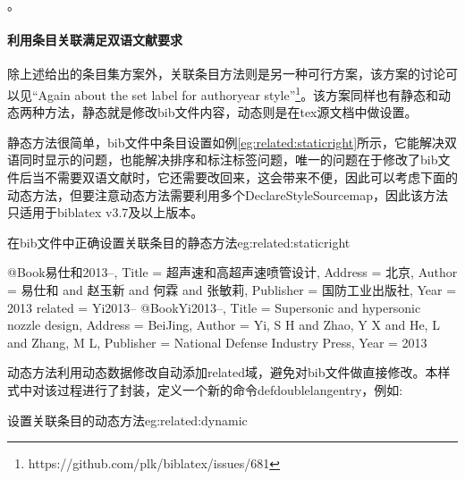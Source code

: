 。

\paragraph{利用条目关联满足双语文献要求}

除上述给出的条目集方案外，关联条目方法则是另一种可行方案，该方案的讨论可以见“Again about the \@ set label for authoryear style”\footnote{https://github.com/plk/biblatex/issues/681}。该方案同样也有静态和动态两种方法，静态就是修改bib文件内容，动态则是在tex源文档中做设置。

静态方法很简单，bib文件中条目设置如例\ref{eg:related:staticright}所示，它能解决双语同时显示的问题，也能解决排序和标注标签问题，唯一的问题在于修改了bib文件后当不需要双语文献时，它还需要改回来，这会带来不便，因此可以考虑下面的动态方法，但要注意动态方法需要利用多个DeclareStyleSourcemap，因此该方法只适用于biblatex v3.7及以上版本。

\begin{example}{在bib文件中正确设置关联条目的静态方法}{eg:related:staticright}
\begin{texlist}
@Book{易仕和2013--,
  Title                    = {超声速和高超声速喷管设计},
  Address                  = {北京},
  Author                   = {易仕和 and 赵玉新 and 何霖 and 张敏莉},
  Publisher                = {国防工业出版社},
  Year                     = {2013}
  related                  = {Yi2013--}
}
@Book{Yi2013--,
  Title                    = {Supersonic and hypersonic nozzle design},
  Address                  = {BeiJing},
  Author                   = {Yi, S H and Zhao, Y X and He, L and Zhang, M L},
  Publisher                = {National Defense Industry Press},
  Year                     = {2013}
}
\end{texlist}
\end{example}

动态方法利用动态数据修改自动添加related域，避免对bib文件做直接修改。本样式中对该过程进行了封装，定义一个新的命令defdoublelangentry，例如:
\begin{example}{设置关联条目的动态方法}{eg:related:dynamic}
\begin{texlist}
\end{texlist}
\end{example}

